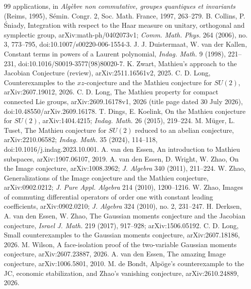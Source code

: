 \documentclass[11pt]{article}
\theoremstyle{remark}
\begin{document}
\begin{thebibliography}{99}
applications, in \emph{Alg\`ebre non commutative, groupes quantiques et invariants} (Reims,
1995), S\'emin. Congr. 2, Soc. Math. France, 1997, 263--279.
 B. Collins, P. \'Sniady, Integration with respect to the Haar measure on unitary, orthogonal and symplectic group, arXiv:math-ph/0402073v1; \emph{Comm. Math. Phys.} 264 (2006), no. 3, 773--795, doi:10.1007/s00220-006-1554-3.
 J. J. Duistermaat, W. van der Kallen, Constant terms in powers of a Laurent
polynomial, \emph{Indag. Math.} 9 (1998), 221--231, doi:10.1016/S0019-3577(98)80020-7.
 K. Zwart, Mathieu's approach to the Jacobian Conjecture (review),
arXiv:2511.16561v2, 2025.
 C. D. Long, Counterexamples to the $xz$-conjecture and the Mathieu conjecture
for $SU(2)$, arXiv:2607.19012, 2026.
 C. D. Long, The Mathieu property for compact connected Lie groups, arXiv:2609.16178v1, 2026 (title page dated 30 July 2026), doi:10.48550/arXiv.2609.16178.
 T. Dings, E. Koelink, On the Mathieu conjecture for $SU(2)$, arXiv:1404.4215; \emph{Indag. Math.} 26 (2015), 219--224.
 M. M\"uger, L. Tuset, The Mathieu conjecture for $SU(2)$ reduced to an abelian conjecture, arXiv:2210.06582; \emph{Indag. Math.} 35 (2024), 114--118, doi:10.1016/j.indag.2023.10.001.
 A. van den Essen, An introduction to Mathieu subspaces, arXiv:1907.06107, 2019.
 A. van den Essen, D. Wright, W. Zhao, On the Image conjecture, arXiv:1008.3962; \emph{J. Algebra} 340 (2011), 211--224.
 W. Zhao, Generalizations of the Image conjecture and the Mathieu conjecture, arXiv:0902.0212; \emph{J. Pure Appl. Algebra} 214 (2010), 1200--1216.
 W. Zhao, Images of commuting differential operators of order one with constant leading coefficients, arXiv:0902.0210; \emph{J. Algebra} 324 (2010), no. 2, 231--247.
 H. Derksen, A. van den Essen, W. Zhao, The Gaussian moments conjecture and
the Jacobian conjecture, \emph{Israel J. Math.} 219 (2017), 917--928; arXiv:1506.05192.
 C. D. Long, Small counterexamples to the Gaussian moments conjecture,
arXiv:2607.18186, 2026.
 M. Wilson, A face-isolation proof of the two-variable Gaussian moments
conjecture, arXiv:2607.23887, 2026.
 A. van den Essen, The amazing Image conjecture, arXiv:1006.5801, 2010.
 M. de Bondt, Alp\"oge's counterexample to the JC, economic stabilization,
and Zhao's vanishing conjecture, arXiv:2610.24889, 2026.

\end{thebibliography}
\end{document}
